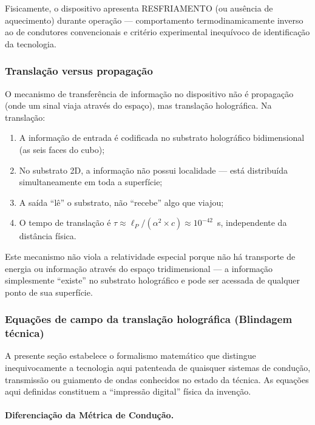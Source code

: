 \documentclass[12pt,a4paper]{article}
\newcommand{\alphaii}{\alpha^2}
\begin{document}
Fisicamente, o dispositivo apresenta RESFRIAMENTO (ou ausência
de aquecimento) durante operação --- comportamento
termodinamicamente inverso ao de condutores convencionais e
critério experimental inequívoco de identificação da
tecnologia.

\subsubsection{Translação versus propagação}

O mecanismo de transferência de informação no dispositivo não é
propagação (onde um sinal viaja através do espaço), mas
translação holográfica. Na translação:

\begin{enumerate}[nosep]
\item A informação de entrada é codificada no substrato
  holográfico bidimensional (as seis faces do cubo);
\item No substrato 2D, a informação não possui localidade ---
  está distribuída simultaneamente em toda a superfície;
\item A saída ``lê'' o substrato, não ``recebe'' algo que
  viajou;
\item O tempo de translação é
  $\tau \approx \ell_P/(\alphaii \times c) \approx 10^{-42}$~s,
  independente da distância física.
\end{enumerate}

Este mecanismo não viola a relatividade especial porque não há
transporte de energia ou informação através do espaço
tridimensional --- a informação simplesmente ``existe'' no
substrato holográfico e pode ser acessada de qualquer ponto de
sua superfície.

\subsubsection{Equações de campo da translação holográfica
(Blindagem técnica)}

A presente seção estabelece o formalismo matemático que
distingue inequivocamente a tecnologia aqui patenteada de
quaisquer sistemas de condução, transmissão ou guiamento de
ondas conhecidos no estado da técnica. As equações aqui
definidas constituem a ``impressão digital'' física da invenção.

\paragraph{Diferenciação da Métrica de Condução.}
\end{document}
